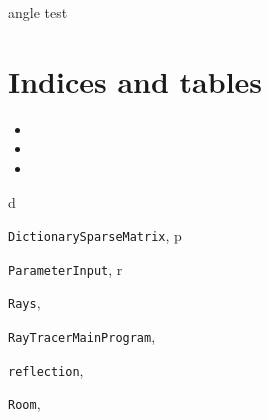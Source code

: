 \documentclass[letterpaper,10pt,english]{sphinxmanual}
\begin{document}
\begin{fulllineitems}
\label{index:reflection.test3}
angle test

\end{fulllineitems}



\chapter{Indices and tables}
\label{index:indices-and-tables}\begin{itemize}
\item {} 

\item {} 

\item {} 

\end{itemize}


\renewcommand{\indexname}{Python Module Index}
\begin{theindex}
\def\bigletter#1{{\Large\sffamily#1}\nopagebreak\vspace{1mm}}
\bigletter{d}
\item {\texttt{DictionarySparseMatrix}}, \pageref{index:module-DictionarySparseMatrix}
\indexspace
\bigletter{p}
\item {\texttt{ParameterInput}}, \pageref{index:module-ParameterInput}
\indexspace
\bigletter{r}
\item {\texttt{Rays}}, \pageref{index:module-Rays}
\item {\texttt{RayTracerMainProgram}}, \pageref{index:module-RayTracerMainProgram}
\item {\texttt{reflection}}, \pageref{index:module-reflection}
\item {\texttt{Room}}, \pageref{index:module-Room}
\end{theindex}

\renewcommand{\indexname}{Index}
\printindex
\end{document}
